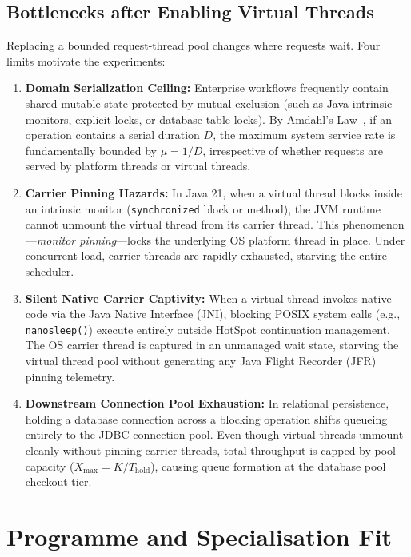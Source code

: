 \subsection{Bottlenecks after Enabling Virtual Threads}
Replacing a bounded request-thread pool changes where requests wait. Four limits motivate the experiments:
\begin{enumerate}
  \item \textbf{Domain Serialization Ceiling:} Enterprise workflows frequently contain shared mutable state protected by mutual exclusion (such as Java intrinsic monitors, explicit locks, or database table locks). By Amdahl's Law~\cite{Amdahl1967}, if an operation contains a serial duration $D$, the maximum system service rate is fundamentally bounded by $\mu = 1/D$, irrespective of whether requests are served by platform threads or virtual threads.
  \item \textbf{Carrier Pinning Hazards:} In Java 21, when a virtual thread blocks inside an intrinsic monitor (\texttt{synchronized} block or method), the JVM runtime cannot unmount the virtual thread from its carrier thread. This phenomenon---\emph{monitor pinning}---locks the underlying OS platform thread in place. Under concurrent load, carrier threads are rapidly exhausted, starving the entire scheduler.
  \item \textbf{Silent Native Carrier Captivity:} When a virtual thread invokes native code via the Java Native Interface (JNI), blocking POSIX system calls (e.g., \texttt{nanosleep()}) execute entirely outside HotSpot continuation management. The OS carrier thread is captured in an unmanaged wait state, starving the virtual thread pool without generating any Java Flight Recorder (JFR) pinning telemetry.
  \item \textbf{Downstream Connection Pool Exhaustion:} In relational persistence, holding a database connection across a blocking operation shifts queueing entirely to the JDBC connection pool. Even though virtual threads unmount cleanly without pinning carrier threads, total throughput is capped by pool capacity ($X_{\text{max}} = K / T_{\text{hold}}$), causing queue formation at the database pool checkout tier.
\end{enumerate}

\section{Programme and Specialisation Fit}
\label{sec:programme-fit}

